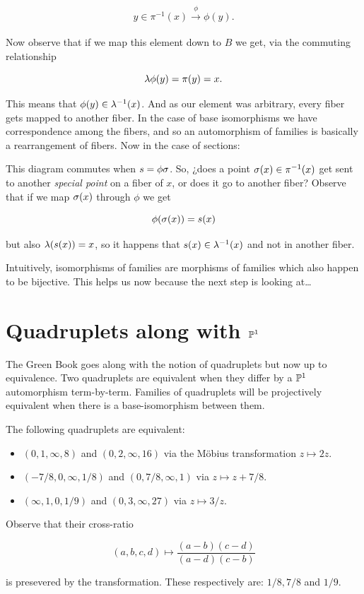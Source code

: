 \documentclass[12pt]{memoir}
\begin{document}
\[y\in\pi^{-1}(x)\xrightarrow[]{\phi}\phi(y).\]

Now observe that if we map this element down to \(B\) we get, via the commuting relationship

\[\lambda\phi(y)=\pi(y)=x.\]

This means that \(\phi(y)\in\lambda^{-1}(x)\). And as our element was arbitrary, every fiber gets mapped to another fiber. In the case of base isomorphisms we have correspondence among the fibers, and so an automorphism of families is basically a rearrangement of fibers.
Now in the case of sections:
\begin{center}
\end{center}
This diagram commutes when \(s=\phi\sigma\). So, ¿does a point \(\sigma(x)\in\pi^{-1}(x)\) get sent to another \emph{special point} on a fiber of \(x\), or does it go to another fiber? Observe that if we map \(\sigma(x)\) through \(\phi\) we get

\[\phi(\sigma(x))=s(x)\]

but also \(\lambda(s(x))=x\), so it happens that \(s(x)\in\lambda^{-1}(x)\) and not in another fiber.

Intuitively, isomorphisms of families are morphisms of families which also happen to be bijective. This helps us now because the next step is looking at\dots

\section{Quadruplets along with \(\mathbb{P}^1\)}

The Green Book goes along with the notion of quadruplets but now up to equivalence. Two quadruplets are equivalent when they differ by a \(\mathbb{P}^1\) automorphism term-by-term. Families of quadruplets will be projectively equivalent when there is a base-isomorphism between them.

\begin{Ex}
    The following quadruplets are equivalent:
    \begin{itemize}
        \item \((0,1,\infty,8)\) and \((0,2,\infty,16)\) via the M\"obius transformation \(z\mapsto 2z\).
        \item \((-7/8,0,\infty,1/8)\) and \((0,7/8,\infty,1)\) via \(z\mapsto z+7/8\).
        \item \((\infty,1,0,1/9)\) and \((0,3,\infty,27)\) via \(z\mapsto 3/z\).
    \end{itemize}
    Observe that their cross-ratio

    \[(a,b,c,d)\mapsto\frac{(a-b)(c-d)}{(a-d)(c-b)}\]

    is presevered by the transformation. These respectively are: \(1/8,7/8\) and \(1/9\).
\end{Ex}
\end{document}
